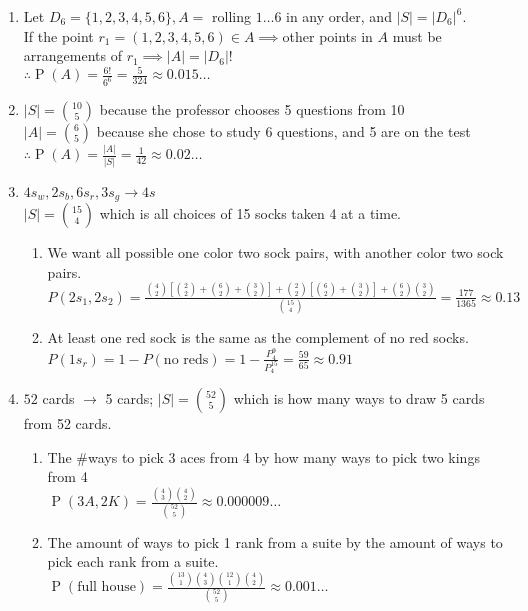 \documentclass{article}
\newcommand{\set}[1]{\{#1\}}
\newcommand{\pr}[1]{\operatorname{P}(#1)}
\begin{document}
\begin{enumerate}
  \item Let $D_6 = \set{1,2,3,4,5,6},A =$ rolling $1\ldots 6$ in any order, and $|S| = |D_6|^6$.\\
  If the point $r_1 = (1,2,3,4,5,6) \in A \implies$other points in $A$ must be arrangements of $r_1 \implies |A| = |D_6|!$\\
  $\therefore \pr{A} = \frac{6!}{6^6} = \frac{5}{324} \approx 0.015\ldots$
  
  \item $|S| = \binom{10}{5}$ because the professor chooses 5 questions from 10\\
  $|A| = \binom{6}{5}$ because she chose to study 6 questions, and 5 are on the test\\
  $\therefore \pr{A} = \frac{|A|}{|S|} = \frac{1}{42} \approx 0.02\ldots$
  
  \item $4s_w, 2s_b, 6s_r, 3s_g \to 4s$\\
  $|S| = \binom{15}{4}$ which is all choices of 15 socks taken 4 at a time.
  \begin{enumerate}
    \item We want all possible one color two sock pairs, with another color two sock pairs.\\
    $P(2s_1, 2s_2) = \frac{
      \binom{4}{2}[\binom{2}{2} + \binom{6}{2} + \binom{3}{2}] +
      \binom{2}{2}[\binom{6}{2} + \binom{3}{2}] +
      \binom{6}{2}\binom{3}{2}}
      {\binom{15}{4}} = \frac{177}{1365} \approx 0.13$
    \item At least one red sock is the same as the complement of no red socks.\\
    $P(1s_r) = 1 - P(\text{no reds}) = 1 - \frac{P_4^{9}}{P_4^{15}} = \frac{59}{65} \approx 0.91$
  \end{enumerate}
  
  \item $52$ cards $\to$ 5 cards; $|S| = \binom{52}{5}$ which is how many ways to draw 5 cards from 52 cards.
  \begin{enumerate}
    \item The \#ways to pick 3 aces from 4 by how many ways to pick two kings from 4\\
    $\pr{3A, 2K} = \frac{\binom{4}{3}\binom{4}{2}}{\binom{52}{5}} \approx 0.000009\ldots$
    \item The amount of ways to pick 1 rank from a suite by the amount of ways to pick each rank from a suite.\\
    $\pr{\text{full house}} = \frac{\binom{13}{1}\binom{4}{3}\binom{12}{1}\binom{4}{2}}{\binom{52}{5}} \approx 0.001\ldots$ 
  \end{enumerate}
  

\end{enumerate}
\end{document}
